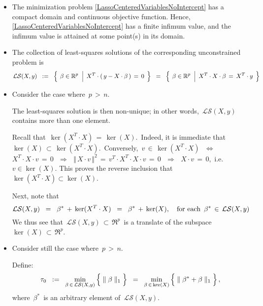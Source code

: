 \begin{itemize}
\item
	The minimization problem \eqref{LassoCenteredVariablesNoIntercept}
	has a compact domain and continuous objective function.
	Hence, \eqref{LassoCenteredVariablesNoIntercept} has a finite infimum value,
	and the infimum value is attained at some point(s) in its domain.
\item
	The collection of least-squares solutions of the corresponding unconstrained problem is
	\begin{equation*}
	\mathcal{LS}(X,y)
	\;\; := \;\;
	\left\{\;
		\left.
		\overset{{\color{white}.}}{\beta} \in \Re^{p}
		\;\;\right\vert\;
		X^{T} \cdot (\,y - X\cdot\beta\,) \,=\, 0
		\,\;\right\}
	\;\; = \;\;
	\left\{\;
		\left.
		\overset{{\color{white}.}}{\beta} \in \Re^{p}
		\;\;\right\vert\;
		X^{T} \cdot X \cdot \beta \, = \, X^{T} \cdot y
		\,\;\right\}
	\end{equation*}
\item
	Consider the case where \,$p \,>\, n$.
	
	\vskip 0.2cm
	The least-squares solution is then non-unique;
	in other words, \,$\mathcal{LS}(X,y)$\, contains more than one element.

	\vskip 0.2cm
	Recall that
	\,$\ker(X^{T} \cdot X) \,=\, \ker(X)$.\,
	Indeed, it is immediate that
	\,$\ker(X) \,\subset\, \ker(X^{T} \cdot X)$.\,
	Conversely, \,$v \,\in\, \ker(X^{T} \cdot X)$\,
	\,$\Longleftrightarrow$\, \,$X^{T} \cdot X \cdot v \,=\, 0$\,
	\,$\Longrightarrow$\, \,$\Vert\,X \cdot v\,\Vert^{2} \,=\, v^{T} \cdot X^{T} \cdot X \cdot v \,=\, 0$\,
	\,$\Longrightarrow$\, \,$X \cdot v \,=\, 0$,\,
	i.e. \,$v \in \ker(X)$.
	This proves the reverse inclusion that
	\,$\ker(X^{T} \cdot X) \subset \ker(X)$.

	\vskip 0.2cm
	Next, note that
	\begin{equation*}
	\mathcal{LS}(X,y)
	\;\; = \;\;
		\beta^{*} \,+\, \ker(X^{T}\cdot X)
	\;\; = \;\;
		\beta^{*} \,+\, \ker(X),
	\quad
	\textnormal{for each \,$\beta^{*} \,\in\, \mathcal{LS}(X,y)$}
	\end{equation*}
	We thus see that
	\,{\color{red}$\mathcal{LS}(X,y) \,\subset\, \Re^{p}$\,
	is a translate of the subspace
	\,$\ker(X) \,\subset\, \Re^{p}$.}
	
\item
	Consider still the case where \,{\color{red}$p \,>\, n$}.
	
	\vskip 0.2cm
	Define:
	\begin{equation*}
	\tau_{0}
	\;\; := \;\;
		\underset{\beta\,\in\,\mathcal{LS}(X,y)}{\min}
		\left\{\;
			\Vert\; \overset{{\color{white}.}}{\beta} \;\Vert_{1}
			\;\right\}
	\;\; = \;\;
		\underset{\beta\,\in\,\ker(X)}{\min}
		\left\{\;
			\Vert\; \beta^{*} + \overset{{\color{white}.}}{\beta} \;\Vert_{1}
			\;\right\},
	\end{equation*}
	where \,$\beta^{*}$\, is an arbitrary element of \,$\mathcal{LS}(X,y)$.
	

\end{itemize}
